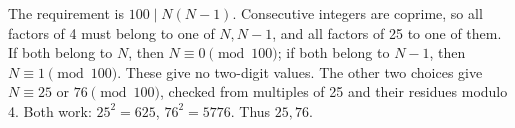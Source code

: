 The requirement is $100\mid N(N-1)$. Consecutive integers are coprime, so all factors of 4 must belong to one of $N,N-1$, and all factors of 25 to one of them. If both belong to $N$, then $N\equiv0\pmod{100}$; if both belong to $N-1$, then $N\equiv1\pmod{100}$. These give no two-digit values. The other two choices give $N\equiv25$ or $76\pmod{100}$, checked from multiples of 25 and their residues modulo 4. Both work: $25^2=625$, $76^2=5776$. Thus $\boxed{25,76}$.

